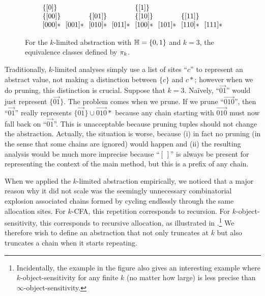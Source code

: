 \begin{figure}
\[
\arraycolsep=3.5pt
\begin{array}{llllllll}
\{\vec{0}\}    &            &              &            & \{\vec{1}\} \\
\{\vec{00}\}   &            & \{\vec{01}\} &            & \{\vec{10}\} &            & \{\vec{11}\} \\
\vec{000}*     & \vec{001}* & \vec{010}*   & \vec{011}* & \vec{100}*   & \vec{101}* & \vec{110}* & \vec{111}*
\end{array}
\]
\caption{\label{fig:repeatingExample} For the $k$-limited abstraction
with ${\mathbb H} = \{ 0, 1 \}$ and $k = 3$, the equivalence classes defined by $\pi_k$.
}
\end{figure}

Traditionally, $k$-limited analyses
simply use a list of sites ``$c$'' to represent an abstract value,
not making a distinction between $\{c\}$ and $c*$;
however when we do pruning, this distinction is crucial.
Suppose that $k=3$.
Na\"ively, ``$\vec{01}$'' would just represent $\{\vec{01}\}$.
The problem comes when we prune.
If we prune ``$\vec{010}$'', then ``$\vec{01}$'' really represents $\{\vec{01}\}\cup \vec{010}*$
because any chain starting with $\vec{010}$ must now fall back on ``$\vec{01}$''.
This is unacceptable because pruning tuples should not change the abstraction.
Actually, the situation is worse, because (i) in fact no pruning
(in the sense that some chains are ignored)
would happen and (ii) the resulting analysis would be much more imprecise because
``$[\,]$'' is always be present for representing the context of the main method,
but this is a prefix of any chain.


When we applied the $k$-limited abstraction empirically,
we noticed that a major reason why it did not scale was
the seemingly unnecessary combinatorial explosion associated chains formed
by cycling endlessly through the same allocation sites.
For $k$-CFA, this repetition corresponds to recursion.
For $k$-object-sensitivity, this corresponds to recursive allocation, as
illustrated in .\footnote{
Incidentally, the example in the figure also gives an interesting example where
$k$-object-sensitivity for any finite $k$ (no matter how large) is less precise
than $\infty$-object-sensitivity.}
We therefore wish to define an abstraction that not only truncates at $k$ but also truncates
a chain when it starts repeating.

